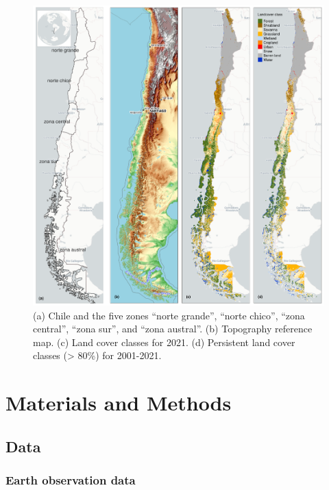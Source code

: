 \documentclass[
  number,
  preprint,
  3p]{elsarticle}
\begin{document}
\begin{figure}[!ht]

{\centering \includegraphics{../output/figs/map_study_con_landcover.png}

}

\caption{(a) Chile and the five zones ``norte grande'', ``norte chico'',
``zona central'', ``zona sur'', and ``zona austral''. (b) Topography
reference map. (c) Land cover classes for 2021. (d) Persistent land
cover classes (\textgreater{} 80\%) for 2001-2021.}

\end{figure}

\hypertarget{materials-and-methods}{%
\section{Materials and Methods}\label{materials-and-methods}}

\hypertarget{data}{%
\subsection{Data}\label{data}}

\hypertarget{earth-observation-data}{%
\subsubsection{Earth observation data}\label{earth-observation-data}}
\end{document}
